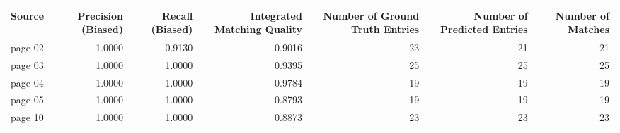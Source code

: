 \begin{tabular}{lrrrrrr}
\toprule
Source & Precision (Biased) & Recall (Biased) & Integrated Matching Quality & Number of Ground Truth Entries & Number of Predicted Entries & Number of Matches \\
\midrule
page 02 & 1.0000 & 0.9130 & 0.9016 & 23 & 21 & 21 \\
page 03 & 1.0000 & 1.0000 & 0.9395 & 25 & 25 & 25 \\
page 04 & 1.0000 & 1.0000 & 0.9784 & 19 & 19 & 19 \\
page 05 & 1.0000 & 1.0000 & 0.8793 & 19 & 19 & 19 \\
page 10 & 1.0000 & 1.0000 & 0.8873 & 23 & 23 & 23 \\
\bottomrule
\end{tabular}
